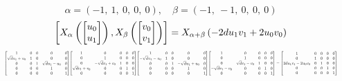 \documentclass[11pt]{article}
\theoremstyle{definition}
\begin{document}
\[
\alpha = \left( -1, \  1, \  0, \  0, \  0\right), \quad \beta = \left( -1, \  -1, \  0, \  0, \  0\right)
\]
\[
\scaletoalign{\textwidth}{\left[ X_{\alpha}\left(\left[\begin{matrix}u_{0}\\u_{1}\end{matrix}\right]\right), X_{\beta}\left(\left[\begin{matrix}v_{0}\\v_{1}\end{matrix}\right]\right) \right] = X_{\alpha + \beta}\left(- 2 d u_{1} v_{1} + 2 u_{0} v_{0}\right)}
\]
\[
\scaletoalign{\textwidth}{{\left[\begin{matrix}1 & 0 & 0 & 0 & 0\\\sqrt{d} u_{1} + u_{0} & 1 & 0 & 0 & 0\\0 & 0 & 1 & \sqrt{d} u_{1} - u_{0} & 0\\0 & 0 & 0 & 1 & 0\\0 & 0 & 0 & 0 & 1\end{matrix}\right]} {\left[\begin{matrix}1 & 0 & 0 & 0 & 0\\0 & 1 & 0 & 0 & 0\\0 & - \sqrt{d} v_{1} + v_{0} & 1 & 0 & 0\\\sqrt{d} v_{1} + v_{0} & 0 & 0 & 1 & 0\\0 & 0 & 0 & 0 & 1\end{matrix}\right]} {\left[\begin{matrix}1 & 0 & 0 & 0 & 0\\- \sqrt{d} u_{1} - u_{0} & 1 & 0 & 0 & 0\\0 & 0 & 1 & - \sqrt{d} u_{1} + u_{0} & 0\\0 & 0 & 0 & 1 & 0\\0 & 0 & 0 & 0 & 1\end{matrix}\right]} {\left[\begin{matrix}1 & 0 & 0 & 0 & 0\\0 & 1 & 0 & 0 & 0\\0 & \sqrt{d} v_{1} - v_{0} & 1 & 0 & 0\\- \sqrt{d} v_{1} - v_{0} & 0 & 0 & 1 & 0\\0 & 0 & 0 & 0 & 1\end{matrix}\right]} = {\left[\begin{matrix}1 & 0 & 0 & 0 & 0\\0 & 1 & 0 & 0 & 0\\2 d u_{1} v_{1} - 2 u_{0} v_{0} & 0 & 1 & 0 & 0\\0 & 0 & 0 & 1 & 0\\0 & 0 & 0 & 0 & 1\end{matrix}\right]}}
\]
\end{document}
